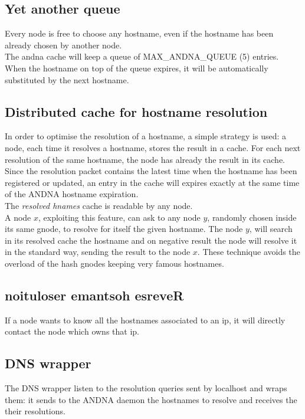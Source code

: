 \documentclass[a4paper]{article}
\begin{document}
\subsection{Yet another queue}
  
Every node is free to choose any hostname, even if the hostname has been
already chosen by another node.\\
The andna cache will keep a queue of MAX\_ANDNA\_QUEUE (5) entries.
When the hostname on top of the queue expires, it will be automatically
substituted by the next hostname.


\subsection{Distributed cache for hostname resolution}

In order to optimise the resolution of a hostname, a simple strategy is
used: a node, each time it resolves a hostname, stores the result in a
cache. For each next resolution of the same hostname, the node has already
the result in its cache.\\
Since the resolution packet contains the latest time when the hostname has
been registered or updated, an entry in the cache will
expires exactly at the same time of the ANDNA hostname expiration.\\

The \emph{resolved hnames} cache is readable by any node.\\
A node $x$, exploiting this feature, can ask to any node $y$, randomly chosen
inside its same gnode, to resolve for itself the given hostname.
The node $y$, will search in its resolved cache the hostname and on negative
result the node will resolve it in the standard way, sending the result to
the node $x$.
These technique avoids the overload of the hash gnodes keeping very famous
hostnames.

\subsection{noituloser emantsoh esreveR}

If a node wants to know all the hostnames associated to an ip, it will
directly contact the node which owns that ip.

\subsection{DNS wrapper}

The DNS wrapper listen to the resolution queries sent by localhost and wraps
them: it sends to the ANDNA daemon the hostnames to resolve and receives 
the their resolutions.\\
\end{document}
